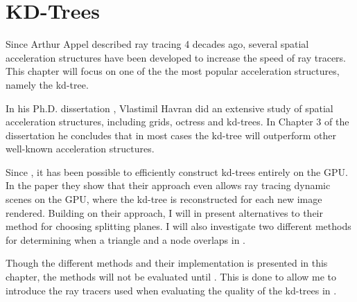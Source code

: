\chapter{KD-Trees}\label{chp:kdTrees}






Since Arthur Appel described ray tracing 4 decades ago, several
spatial acceleration structures have been developed to increase the
speed of ray tracers. This chapter will focus on one of the the most
popular acceleration structures, namely the kd-tree.


In his Ph.D. dissertation , Vlastimil Havran did
an extensive study of spatial acceleration structures, including
grids, octress and kd-trees. In Chapter 3 of the dissertation he
concludes that in most cases the kd-tree will outperform other
well-known acceleration structures.

Since \zhou{}, it has been possible to efficiently construct kd-trees entirely
on the GPU. In the paper they show that their approach even allows ray tracing
dynamic scenes on the GPU, where the kd-tree is reconstructed for each new image
rendered. Building on their approach, I will in 
present alternatives to their method for choosing splitting planes. I will also
investigate two different methods for determining when a triangle and a node
overlaps in .

Though the different methods and their implementation is presented in this
chapter, the methods will not be evaluated until . This
is done to allow me to introduce the ray tracers used when evaluating the
quality of the kd-trees in .


